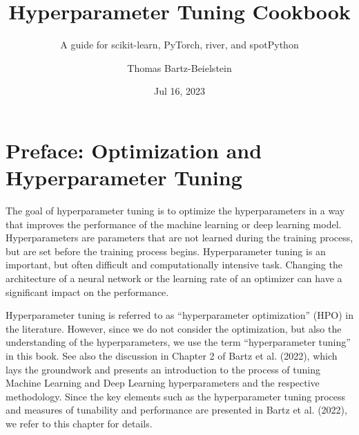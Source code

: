\documentclass[
  letterpaper,
  DIV=11,
  numbers=noendperiod]{scrreprt}
\title{Hyperparameter Tuning Cookbook}
\subtitle{A guide for scikit-learn, PyTorch, river, and spotPython}
\author{Thomas Bartz-Beielstein}
\date{Jul 16, 2023}
\renewcommand*\contentsname{Table of contents}
\newcommand\contentsname{Table of contents}
\begin{document}
\maketitle
\ifdefined\Shaded\renewenvironment{Shaded}{\begin{tcolorbox}[boxrule=0pt, frame hidden, sharp corners, breakable, interior hidden, borderline west={3pt}{0pt}{shadecolor}, enhanced]}{\end{tcolorbox}}\fi

\renewcommand*\contentsname{Table of contents}
{
\hypersetup{linkcolor=}
\setcounter{tocdepth}{2}
\tableofcontents
}

\hypertarget{preface-optimization-and-hyperparameter-tuning}{%
\chapter*{Preface: Optimization and Hyperparameter
Tuning}\label{preface-optimization-and-hyperparameter-tuning}}


The goal of hyperparameter tuning is to optimize the hyperparameters in
a way that improves the performance of the machine learning or deep
learning model. Hyperparameters are parameters that are not learned
during the training process, but are set before the training process
begins. Hyperparameter tuning is an important, but often difficult and
computationally intensive task. Changing the architecture of a neural
network or the learning rate of an optimizer can have a significant
impact on the performance.

Hyperparameter tuning is referred to as ``hyperparameter optimization''
(HPO) in the literature. However, since we do not consider the
optimization, but also the understanding of the hyperparameters, we use
the term ``hyperparameter tuning'' in this book. See also the discussion
in Chapter 2 of Bartz et al. (2022), which lays the groundwork and
presents an introduction to the process of tuning Machine Learning and
Deep Learning hyperparameters and the respective methodology. Since the
key elements such as the hyperparameter tuning process and measures of
tunability and performance are presented in Bartz et al. (2022), we
refer to this chapter for details.
\end{document}
